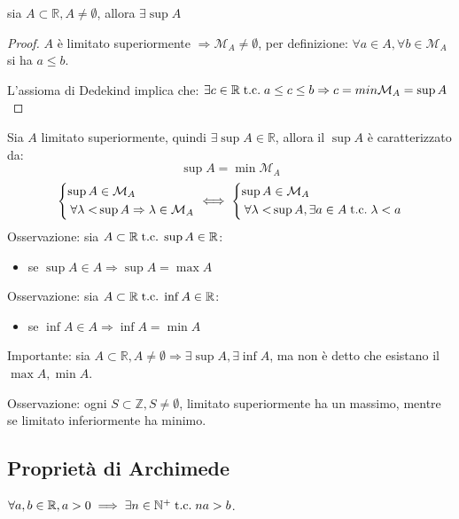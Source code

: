 \documentclass[a4paper,12pt]{article}
\begin{document}
	\begin{proposition}
		sia $A \subset \mathbb{R}, A \not = \emptyset$, allora $\exists \sup A$
	\end{proposition}
	
	\begin{proof}
		$A $ è limitato superiormente $\Rightarrow \mathcal{M}_A \not = \emptyset$, per definizione: $\forall a \in A,\forall b \in \mathcal{M}_A$ si ha $a \leq b$.
		
		L'assioma di Dedekind implica che: $\exists c \in \mathbb{R} \;\text{t.c.}\; a \leq c \leq b \Rightarrow c = min \mathcal{M}_A = \sup A$
	\end{proof}
	
	Sia $A$ limitato superiormente, quindi $\exists \sup A \in \mathbb{R}$, allora il $\sup A$ è caratterizzato da:
	\[\sup A = \min \mathcal{M}_A\]
	\[
	\left\{
	\begin{aligned}
		\sup A &\in \mathcal{M}_A \\
		\forall \lambda < &\sup A \Rightarrow \lambda\in \mathcal{M}_A
	\end{aligned}
	\right. \iff \left\{
	\begin{aligned}
	\sup A &\in \mathcal{M}_A \\
	\forall \lambda < &\sup A, \exists a \in A \;\text{t.c.}\; \lambda < a
	\end{aligned}\right.
	\]
	Osservazione:
	sia $A \subset \mathbb{R} \;\text{t.c.}\; \sup A \in \mathbb{R}$:
	\begin{itemize}
		\item se $\sup A \in A \Rightarrow \sup A = \max A$
	\end{itemize}
	Osservazione: sia $A \subset \mathbb{R} \;\text{t.c.}\; \inf A \in \mathbb{R}$:
	\begin{itemize}
	\item se $\inf A \in A \Rightarrow \inf A = \min A$
	\end{itemize}	
	Importante:
	sia $A \subset \mathbb{R}, A \not = \emptyset \Rightarrow \exists \sup A, \exists \inf A $, ma non è detto che esistano il $\max A, \min A$.
	
	Osservazione:
	ogni $S \subset \mathbb{Z}, S \not = \emptyset$, limitato superiormente ha un massimo, mentre se limitato inferiormente ha minimo.
	
	\subsection{Proprietà di Archimede}
	$\forall a, b \in \mathbb{R}, a > 0 \implies \exists n \in \mathbb{N}^+ \;\text{t.c.}\; na > b$.
	
\end{document}
